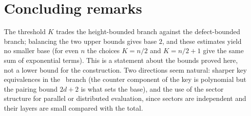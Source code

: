 \section{Concluding remarks}
\label{sec:conclusion}

The threshold $K$ trades the height-bounded branch against the defect-bounded
branch; balancing the two upper bounds gives base $2$, and these estimates
yield no smaller base (for even $n$ the choices $K=n/2$ and $K=n/2+1$ give
the same sum of exponential terms). This is a statement about the bounds
proved here, not a lower bound for the construction. Two directions seem
natural: sharper key equivalences in the \HIGH\ branch (the counter component
of the key is polynomial but the pairing bound $2d+2$ is what sets the base),
and the use of the sector structure for parallel or distributed evaluation,
since sectors are independent and their layers are small compared with the
total.

\appendix
